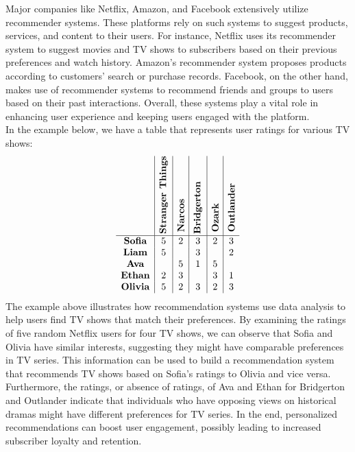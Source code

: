 \documentclass[12pt]{article}
\begin{document}
Major companies like Netflix, Amazon, and Facebook extensively utilize recommender systems. These platforms rely on such systems to suggest products, services, and content to their users. For instance, Netflix uses its recommender system to suggest movies and TV shows to subscribers based on their previous preferences and watch history. Amazon's recommender system proposes products according to customers' search or purchase records. Facebook, on the other hand, makes use of recommender systems to recommend friends and groups to users based on their past interactions. Overall, these systems play a vital role in enhancing user experience and keeping users engaged with the platform.\\
\newline
In the example below, we have a table that represents user ratings for various TV shows:\\
\newline
\[
\begin{array}{c|c|c|c|c|c}
 & \rotatebox[origin=bl]{90}{\textbf{Stranger Things}} & \rotatebox[origin=bl]{90}{\textbf{Narcos}} & \rotatebox[origin=bl]{90}{\textbf{Bridgerton}} & \rotatebox[origin=bl]{90}{\textbf{Ozark}} & \rotatebox[origin=bl]{90}{\textbf{Outlander}} \\
\hline
\textbf{Sofia} & 5 & 2 & 3 & 2 & 3\\
\textbf{Liam} & 5 &  & 3 &  & 2\\
\textbf{Ava} &  & 5 & 1 & 5 &  \\
\textbf{Ethan} & 2 & 3 &  & 3 & 1\\
\textbf{Olivia} & 5 & 2 & 3 & 2 & 3\\
\end{array}
\]
The example above illustrates how recommendation systems use data analysis to help users find TV shows that match their preferences. By examining the ratings of five random Netflix users for four TV shows, we can observe that Sofia and Olivia have similar interests, suggesting they might have comparable preferences in TV series. This information can be used to build a recommendation system that recommends TV shows based on Sofia's ratings to Olivia and vice versa. Furthermore, the ratings, or absence of ratings, of Ava and Ethan for Bridgerton and Outlander indicate that individuals who have opposing views on historical dramas might have different preferences for TV series. In the end, personalized recommendations can boost user engagement, possibly leading to increased subscriber loyalty and retention.
\end{document}
